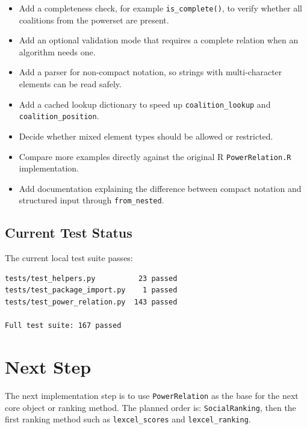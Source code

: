 \documentclass[11pt]{article}
\begin{document}
\begin{itemize}
  \item Add a completeness check, for example \texttt{is\_complete()}, to
  verify whether all coalitions from the powerset are present.
  \item Add an optional validation mode that requires a complete relation when
  an algorithm needs one.
  \item Add a parser for non-compact notation, so strings with multi-character
  elements can be read safely.
  \item Add a cached lookup dictionary to speed up
  \texttt{coalition\_lookup} and \texttt{coalition\_position}.
  \item Decide whether mixed element types should be allowed or restricted.
  \item Compare more examples directly against the original R
  \texttt{PowerRelation.R} implementation.
  \item Add documentation explaining the difference between compact notation
  and structured input through \texttt{from\_nested}.
\end{itemize}

\subsection{Current Test Status}

The current local test suite passes:

\begin{verbatim}
tests/test_helpers.py          23 passed
tests/test_package_import.py    1 passed
tests/test_power_relation.py  143 passed

Full test suite: 167 passed
\end{verbatim}

\section{Next Step}

The next implementation step is to use \texttt{PowerRelation} as the base for
the next core object or ranking method. The planned order is:
\texttt{SocialRanking}, then the first ranking method such as
\texttt{lexcel\_scores} and \texttt{lexcel\_ranking}.


\end{document}
